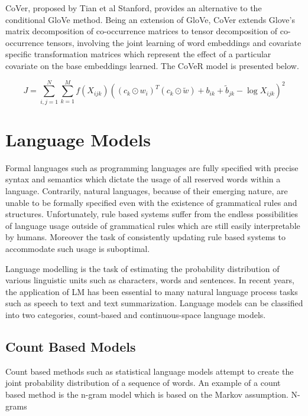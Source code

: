 \noindent
\newline
CoVer, proposed by Tian et al Stanford, provides an alternative to the conditional GloVe method. Being an extension of GloVe, CoVer extends Glove's matrix decomposition of co-occurrence matrices to tensor decomposition of co-occurrence tensors, involving the joint learning of word embeddings and covariate specific transformation matrices which represent the effect of a particular covariate on the base embeddings learned. The CoVeR model is presented below.

\begin{equation}
J = \sum_{i, j=1}^{N} \sum_{k=1}^{M} f(X_{ijk}) ((c_{k} \odot w_{i})^{T} (c_{k} \odot \tilde{w}) + b_{ik} + \tilde{b}_{jk} - \log{X_{ijk}})^{2}
\end{equation}


\section{Language Models}
Formal languages such as programming languages are fully specified with precise syntax and semantics which dictate the usage of all reserved words within a language. Contrarily, natural languages, because of their emerging nature, are unable to be formally specified even with the existence of grammatical rules and structures. Unfortunately, rule based systems suffer from the endless possibilities of language usage outside of grammatical rules which are still easily interpretable by humans. Moreover the task of consistently updating rule based systems to accommodate such usage is suboptimal.  

\noindent
\newline
Language modelling is the task of estimating the probability distribution of various linguistic units such as characters, words and sentences. In recent years, the application of LM  has been essential to many natural language process tasks such as speech to text and text summarization. Language models can be classified into two categories, count-based and continuous-space language models. 

\subsection{Count Based Models}
Count based methods such as statistical language models attempt to create the joint probability distribution of a sequence of words. An example of a count based method is the n-gram model which is based on the Markov assumption. N-grams


